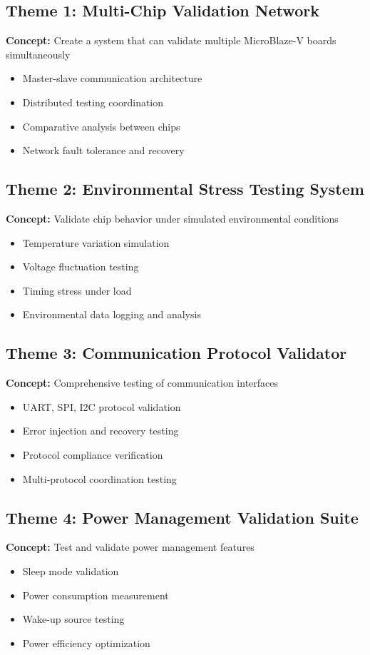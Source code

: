 \documentclass[11pt,a4paper]{article}
\begin{document}
\subsection{Theme 1: Multi-Chip Validation Network}
\textbf{Concept:} Create a system that can validate multiple MicroBlaze-V boards simultaneously
\begin{itemize}
    \item Master-slave communication architecture
    \item Distributed testing coordination
    \item Comparative analysis between chips
    \item Network fault tolerance and recovery
\end{itemize}

\subsection{Theme 2: Environmental Stress Testing System}
\textbf{Concept:} Validate chip behavior under simulated environmental conditions
\begin{itemize}
    \item Temperature variation simulation
    \item Voltage fluctuation testing
    \item Timing stress under load
    \item Environmental data logging and analysis
\end{itemize}

\subsection{Theme 3: Communication Protocol Validator}
\textbf{Concept:} Comprehensive testing of communication interfaces
\begin{itemize}
    \item UART, SPI, I2C protocol validation
    \item Error injection and recovery testing
    \item Protocol compliance verification
    \item Multi-protocol coordination testing
\end{itemize}

\subsection{Theme 4: Power Management Validation Suite}
\textbf{Concept:} Test and validate power management features
\begin{itemize}
    \item Sleep mode validation
    \item Power consumption measurement
    \item Wake-up source testing
    \item Power efficiency optimization
\end{itemize}
\end{document}
